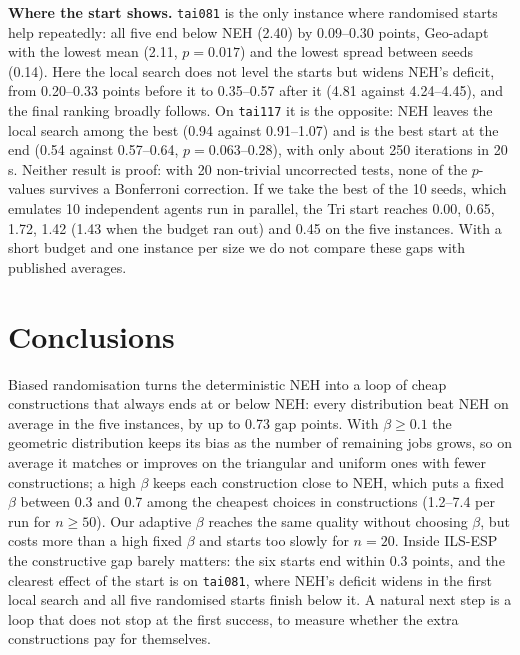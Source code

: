 \documentclass[10pt,a4paper]{article}
\begin{document}
\textbf{Where the start shows.} \texttt{tai081} is the only instance where randomised starts help
repeatedly: all five end below NEH (2.40) by 0.09--0.30 points, Geo-adapt with the lowest mean (2.11,
$p=0.017$) and the lowest spread between seeds (0.14). Here the local search does not level the starts
but widens NEH's deficit, from 0.20--0.33 points before it to 0.35--0.57 after it (4.81 against
4.24--4.45), and the final ranking broadly follows. On \texttt{tai117} it is the opposite: NEH leaves the local
search among the best (0.94 against 0.91--1.07) and is the best start at the end (0.54 against
0.57--0.64, $p=0.063$--$0.28$), with only about 250 iterations in 20\,s. Neither result is proof: with
20 non-trivial uncorrected tests, none of the $p$-values survives a Bonferroni correction.
If we take the best of the 10 seeds, which emulates 10 independent agents run in parallel, the Tri
start reaches 0.00, 0.65, 1.72, 1.42 (1.43 when the budget ran out) and 0.45 on the five instances. With a short budget and one instance per
size we do not compare these gaps with published averages.

\section{Conclusions}

Biased randomisation turns the deterministic NEH into a loop of cheap constructions that always ends at
or below NEH: every distribution beat NEH on average in the five instances, by up to 0.73 gap points.
With $\beta\ge0.1$ the geometric distribution keeps its bias as the number of remaining jobs grows,
so on average it matches or improves on the triangular and uniform ones with fewer constructions; a high $\beta$
keeps each construction close to NEH, which puts a fixed $\beta$ between 0.3 and 0.7 among the cheapest
choices in constructions (1.2--7.4 per run for $n\ge50$). Our adaptive $\beta$ reaches the same quality
without choosing $\beta$, but costs more than a high fixed $\beta$ and starts too slowly for $n=20$.
Inside ILS-ESP the constructive gap barely matters: the six starts end within 0.3 points, and the
clearest effect of the start is on \texttt{tai081}, where NEH's deficit widens in the first local
search and all five randomised starts finish below it. A natural next step is a loop that
does not stop at the first success, to measure whether the extra constructions pay for themselves.
\end{document}
